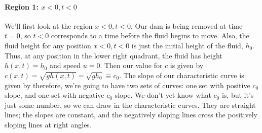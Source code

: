 \documentclass[12pt]{book}
\begin{document}
\paragraph{Region 1: $x<0\comma t<0$} 
We'll first look at the region $x<0\comma t<0$.  Our dam is being removed at time $t=0$, so $t<0$ corresponds to a time before the fluid begins to move.  Also, the fluid height for any position $x<0\comma t<0$ is just the initial height of the fluid, $h_0$.  Thus, at any position in the lower right quadrant, the fluid has height $h(x,t)=h_0$ and speed $u=0$.  Then our value for $c$ is given by $c(x,t)=\sqrt{gh(x,t)}=\sqrt{gh_0}\equiv c_0$.  The slope of our characteristic curve is given by 
therefore, we're going to have two sets of curves: one set with positive  $c_0$ slope, and one set with negative $c_0$ slope.  We don't yet know what $c_0$ is, but it's just some number, so we can draw in the characteristic curves.  They are straight lines; the slopes are constant, and the negatively sloping lines cross the positively sloping lines at right angles.  
\end{document}
